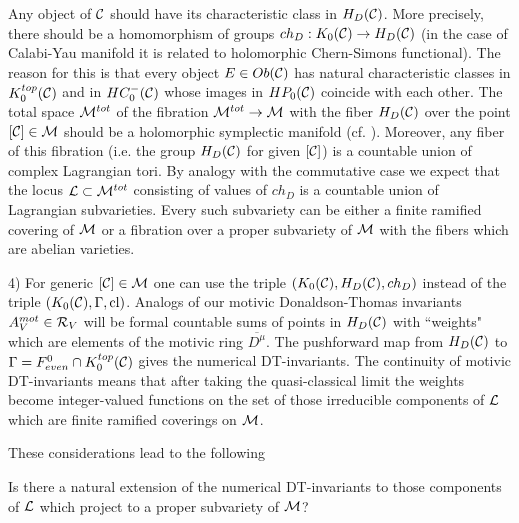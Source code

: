 \documentclass[12pt]{article}
\begin{document}
Any object of ${\mathcal C}$ should have its characteristic class in $H_{D}({\mathcal C})$. More precisely, there should be a homomorphism of groups $ch_D: K_0({\mathcal C})\to H_{D}({\mathcal C})$ (in the case of  Calabi-Yau manifold it is related to holomorphic Chern-Simons functional). The reason for this is that every object $E\in Ob({\mathcal C})$
  has natural characteristic classes in $K^{top}_0({\mathcal C})$ and in $HC_0^-({\mathcal C})$ whose images in $HP_0({\mathcal C})$ coincide with each other. 
The total space ${\cal M}^{tot}$ of the fibration ${\cal M}^{tot}\to {\cal M}$
with the fiber $H_{D}({\mathcal C})$ over the point $[{\mathcal C}]\in {\cal M}$ should be a holomorphic symplectic manifold (cf. \cite{DonM}). Moreover, any fiber of this fibration (i.e. the group $H_{D}({\mathcal C})$ for given $[{\mathcal C}]$) is a countable union of complex Lagrangian tori.
By analogy with the commutative case we expect that the locus ${\cal L}\subset {\cal M}^{tot}$ consisting of values of $ch_D$ is a countable union of Lagrangian subvarieties. Every such subvariety can be either a finite ramified covering of ${\cal M}$ or a fibration over a proper subvariety of ${\cal M}$ with the fibers which are abelian varieties.

4) For generic $[{\mathcal C}]\in {\cal M} $ one can use the triple $(K_0({\mathcal C}),H_{D}({\mathcal C}),ch_D)$ instead of the triple $(K_0({\mathcal C}),\Gamma,\operatorname{cl})$. Analogs of our motivic Donaldson-Thomas invariants $A_V^{mot}\in {\cal R}_V$ will be  formal countable sums of points in $H_{D}({\mathcal C})$ with ``weights" which are elements of the motivic ring ${\overline{D^{\mu}}}$. The pushforward map from
$H_{D}({\mathcal C})$ to $\Gamma=F^0_{even}\cap K^{top}_{0}({\mathcal C})$ gives the numerical DT-invariants. The continuity of motivic DT-invariants means that after taking the quasi-classical limit the weights become integer-valued functions on the set of those irreducible components of ${\cal L}$ which are finite ramified coverings on ${\cal M}$.

These considerations lead to the following  


\begin{que} Is there a natural extension of the numerical DT-invariants to those components of ${\cal L}$ which project to a proper subvariety of ${\cal M}$?


\end{que}
\end{document}
